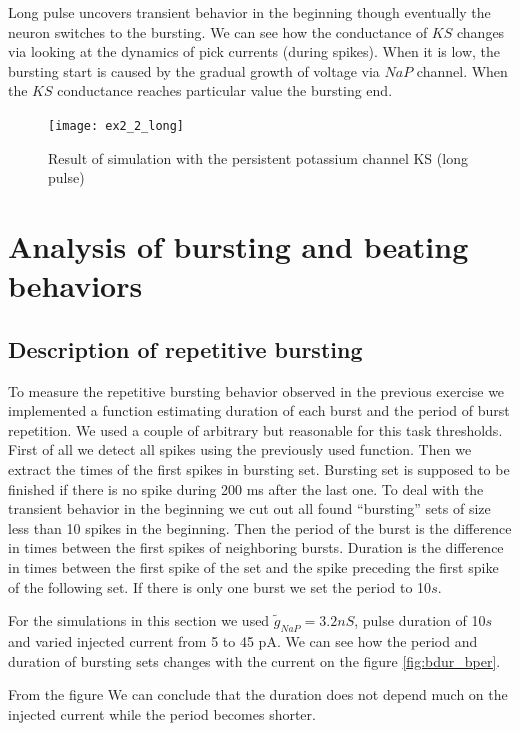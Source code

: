 \documentclass[a4paper,11pt]{article} %
\begin{document}
Long pulse uncovers transient behavior in the beginning though eventually the neuron
switches to the bursting. We can see how the conductance of $KS$ changes via looking
at the dynamics of pick currents (during spikes). When it is low, the bursting start
is caused by the gradual growth of voltage via $NaP$ channel. When the $KS$ conductance
reaches particular value the bursting end.

\begin{figure}[H]
    \centering
    \texttt{[image: ex2\_2\_long]}
    \caption{Result of simulation with the persistent potassium channel KS (long pulse)}
    \label{fig:long}
\end{figure}

\section{Analysis of bursting and beating behaviors}
\subsection{Description of repetitive bursting}

To measure the repetitive bursting behavior observed in the previous exercise
we implemented a function estimating duration of each burst and the period of
burst repetition. We used a couple of arbitrary but reasonable for this task thresholds.
First of all we detect all spikes using the previously used function. Then we 
extract the times of the first spikes in bursting set.
Bursting set is supposed to be finished if there is no spike during 200 ms after the last one.
To deal with the transient behavior in the beginning we cut out all found ``bursting'' sets of size
less than 10 spikes in the beginning. Then the period of the burst is the difference in times
between the first spikes of neighboring bursts. Duration is the difference in times between the
first spike of the set and the spike preceding the first spike of the following set.
If there is only one burst we set the period to 10$s$.

For the simulations in this section we used $\tilde{g}_{NaP} = 3.2nS$, pulse
duration of 10$s$ and varied injected current from 5 to 45 pA.
We can see how the period and duration of bursting sets changes with 
the current on the figure \ref{fig:bdur_bper}.

From the figure We can conclude that the duration does not depend much on the
injected current while the period becomes shorter.
\end{document}
